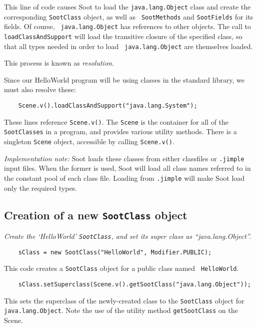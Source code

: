 \documentclass{article}
\begin{document}
This line of code causes Soot to load the {\tt java.lang.Object} class
and create the corresponding {\tt SootClass} object, as well as {\tt
SootMethods} and {\tt SootFields} for its fields.  Of course, {\tt
java.lang.Object} has references to other objects.  The call to {\tt
loadClassAndSupport} will load the transitive closure of the specified
class, so that all types needed in order to load {\tt
java.lang.Object} are themselves loaded.

This process is known as {\em resolution}.

Since our HelloWorld program will be using classes in the standard library, we 
must also resolve these:

\noindent
\begin{verbatim}
    Scene.v().loadClassAndSupport("java.lang.System");
\end{verbatim}

These lines reference {\tt Scene.v()}.  The {\tt Scene} is the
container for all of the {\tt SootClasses} in a program, and provides
various utility methods.  There is a singleton {\tt Scene} object,
accessible by calling {\tt Scene.v()}.

\noindent
{\em Implementation note:} Soot loads these classes from either
classfiles or {\tt .jimple} input files.  When the former is used,
Soot will load all class names referred to in the constant pool of
each class file.  Loading from {\tt .jimple} will make Soot load only
the required types.


\subsection{Creation of a new {\tt SootClass} object}

{\em Create the `HelloWorld' {\tt SootClass}, and set its super class
    as ``java.lang.Object''.}

\noindent
\begin{verbatim}    sClass = new SootClass("HelloWorld", Modifier.PUBLIC);\end{verbatim}

This code creates a {\tt SootClass} object for a public class named {\tt
HelloWorld}.

\noindent
\begin{verbatim}    sClass.setSuperclass(Scene.v().getSootClass("java.lang.Object"));\end{verbatim}

This sets the superclass of the newly-created class to the {\tt SootClass}
object for {\tt java.lang.Object}.  Note the use of the utility method
{\tt getSootClass} on the Scene.
\end{document}
